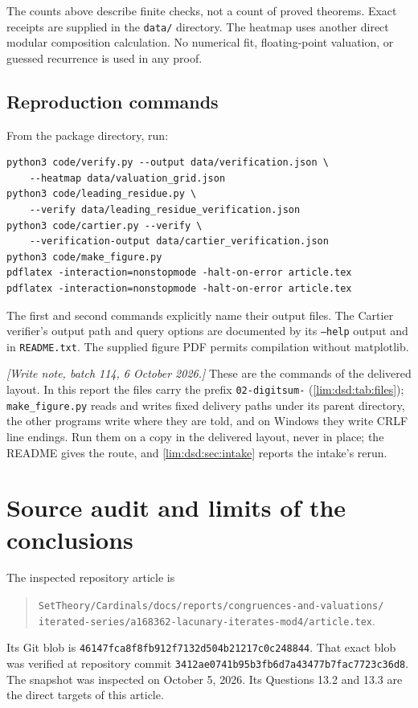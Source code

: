 \documentclass[11pt]{article}
\theoremstyle{definition}
\theoremstyle{remark}
\begin{document}
The counts above describe finite checks, not a count of proved
theorems. Exact receipts are supplied in the \texttt{data/} directory.
The heatmap uses another direct modular composition calculation.
No numerical fit, floating-point valuation, or guessed recurrence
is used in any proof.

\subsection{Reproduction commands}

From the package directory, run:
\begin{verbatim}
python3 code/verify.py --output data/verification.json \
    --heatmap data/valuation_grid.json
python3 code/leading_residue.py \
    --verify data/leading_residue_verification.json
python3 code/cartier.py --verify \
    --verification-output data/cartier_verification.json
python3 code/make_figure.py
pdflatex -interaction=nonstopmode -halt-on-error article.tex
pdflatex -interaction=nonstopmode -halt-on-error article.tex
\end{verbatim}
The first and second commands explicitly name their output files.
The Cartier verifier's output path and query options are documented
by its \texttt{--help} output and in \texttt{README.txt}.
The supplied figure PDF permits compilation without matplotlib.

\emph{[Write note, batch 114, 6 October 2026.]} These are the commands of the delivered layout. In
this report the files carry the prefix \texttt{02-digitsum-}
(\cref{lim:dsd:tab:files}); \texttt{make\_figure.py} reads and writes fixed
delivery paths under its parent directory, the other programs write where
they are told, and on Windows they write CRLF line endings. Run them on a
copy in the delivered layout, never in place; the README gives the route,
and \cref{lim:dsd:sec:intake} reports the intake's rerun.

\section{Source audit and limits of the conclusions}
\label{lim:dsd:sec:audit}

The inspected repository article is
\begin{quote}\small
\nolinkurl{SetTheory/Cardinals/docs/reports/congruences-and-valuations/}\\
\nolinkurl{iterated-series/a168362-lacunary-iterates-mod4/article.tex}.
\end{quote}
Its Git blob is
\nolinkurl{46147fca8f8fb912f7132d504b21217c0c248844}.
That exact blob was verified at repository commit
\nolinkurl{3412ae0741b95b3fb6d7a43477b7fac7723c36d8}.
The snapshot was inspected on October 5, 2026. Its Questions 13.2
and 13.3 are the direct targets of this article.
\end{document}
